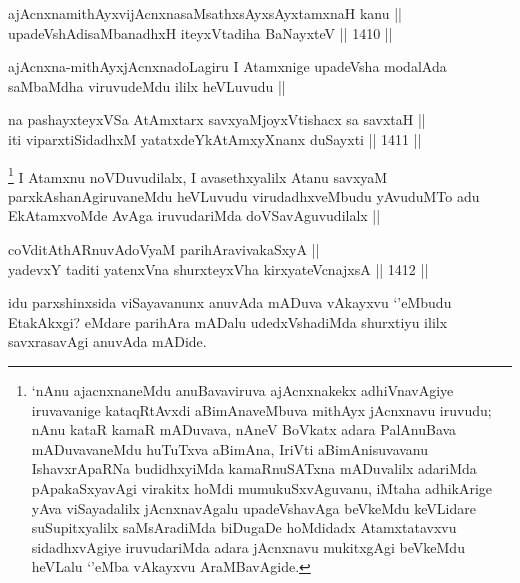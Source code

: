 
\begin{shl}
ajAcnxnamithAyxvijAcnxnasaMsathxsAyxsAyx\s \s tamxnaH kanu || \\
upadeVshAdisaMbanadhxH iteyxVtadiha BaNayxteV ||  1410 ||  
\end{shl}	

\begin{artha}
ajAcnxna-mithAyxjAcnxnadoLagiru I Atamxnige upadeVsha modalAda saMbaMdha viruvudeMdu ililx heVLuvudu ||
\end{artha}


\begin{shl}
na pashayxteyxVSa AtAmx\s tarx savxyaMjoyxVtishacx sa savxtaH || \\
iti viparxtiSidadhxM yatatxdeYkAtAmxyXnanx duSayxti ||  1411 || 
\end{shl}

\begin{artha}
\footnote{`nAnu ajacnxnaneMdu anuBavaviruva ajAcnxnakekx adhiVnavAgiye iruvavanige kataqRtAvxdi aBimAnaveMbuva mithAyx jAcnxnavu iruvudu; nAnu kataR kamaR mADuvava, nAneV BoVkatx adara PalAnuBava mADuvavaneMdu huTuTxva aBimAna, IriVti aBimAnisuvavanu IshavxrApaRNa budidhxyiMda kamaRnuSATxna mADuvalilx adariMda pApakaSxyavAgi virakitx hoMdi mumukuSxvAguvanu, iMtaha adhikArige yAva viSayadalilx jAcnxnavAgalu upadeVshavAga beVkeMdu keVLidare suSupitxyalilx saMsAradiMda biDugaDe hoMdidadx Atamxtatavxvu sidadhxvAgiye iruvudariMda adara jAcnxnavu mukitxgAgi beVkeMdu heVLalu `\stext'eMba vAkayxvu AraMBavAgide.}
I Atamxnu noVDuvudilalx, I avasethxyalilx Atanu savxyaM parxkAshanAgiruvaneMdu heVLuvudu virudadhxveMbudu yAvuduMTo adu EkAtamxvoMde AvAga iruvudariMda doVSavAguvudilalx ||
\end{artha}

\begin{shl}
coVditAthARnuvAdoV\s yaM parihAravivakaSxyA || \\
yadevxY taditi yatenxVna shurxteyxVha kirxyateV\s cnajxsA ||  1412 ||  
\end{shl}

\begin{artha}
idu parxshinxsida viSayavanunx anuvAda mADuva vAkayxvu `\stext'eMbudu EtakAkxgi? eMdare parihAra mADalu udedxVshadiMda shurxtiyu ililx savxrasavAgi anuvAda mADide.
\end{artha}

